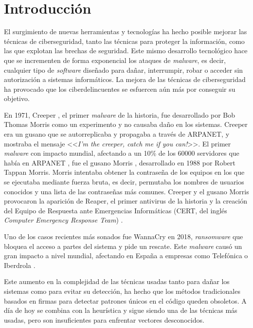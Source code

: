 \chapter{Introducción}
\label{ch:introduccion}

El surgimiento de nuevas herramientas y tecnologías ha hecho posible mejorar las técnicas de ciberseguridad, tanto las técnicas para proteger la información, como las que explotan las brechas de seguridad. Este mismo desarrollo tecnológico hace que se incrementen de forma exponencial los ataques de \textit{malware}, es decir, cualquier tipo de \textit{software} diseñado para dañar, interrumpir, robar o acceder sin autorización a sistemas informáticos. La mejora de las técnicas de ciberseguridad ha provocado que los ciberdelincuentes se esfuercen aún más por conseguir su objetivo.

\vspace{1em}

En 1971, Creeper \cite{creeper}, el primer \textit{malware} de la historia, fue desarrollado por Bob Thomas Morris como un experimento y no causaba daño en los sistemas. Creeper era un gusano que se autorreplicaba y propagaba a través de ARPANET, y mostraba el mensaje <<\textit{I'm the creeper, catch me if you can!}>>. El primer \textit{malware} con impacto mundial, afectando a un 10\% de los 60000 servidores que había en ARPANET \cite{arpanet}, fue el gusano Morris \cite{morris}, desarrollado en 1988 por Robert Tappan Morris. Morris intentaba obtener la contraseña de los equipos en los que se ejecutaba mediante fuerza bruta, es decir, permutaba los nombres de usuarios conocidos y una lista de las contraseñas más comunes. Creeper y el gusano Morris provocaron la aparición de Reaper, el primer antivirus de la historia y la creación del Equipo de Respuesta ante Emergencias Informáticas (CERT, del inglés \textit{Computer Emergency Response Team}) \cite{cert}.

\vspace{1em}

Uno de los casos recientes más sonados fue WannaCry \cite{wannacry} en 2018, \textit{ransomware} \cite{ransomware} que bloquea el acceso a partes del sistema y pide un rescate. Este \textit{malware} causó un gran impacto a nivel mundial, afectando en España a empresas como Telefónica o Iberdrola \cite{noticia_wannacry}.

\vspace{1em}

Este aumento en la complejidad de las técnicas usadas tanto para dañar los sistemas como para evitar su detección, ha hecho que los métodos tradicionales basados en firmas \cite{firmas} para detectar patrones únicos en el código queden obsoletos. A día de hoy se combina con la heurística y sigue siendo una de las técnicas más usadas, pero son insuficientes para enfrentar vectores desconocidos.


